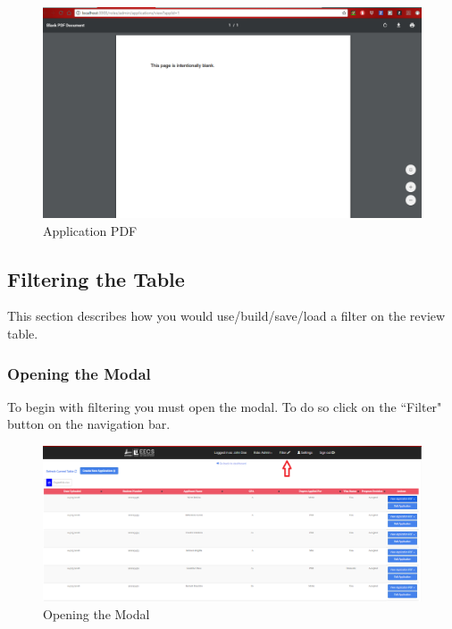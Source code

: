 \documentclass[fontsize=12pt,paper=letter,twoside]{scrartcl}
\begin{document}
\begin{figure}[!htb]
\begin{center}
\includegraphics[width=.9\textwidth]{images/ma/appl_pdf.png}
\end{center}
\caption{Application PDF}
\label{fig:appl_pdf}
\end{figure}

\clearpage
\subsection{Filtering the Table}
This section describes how you would use/build/save/load a filter on the review table.

\subsubsection{Opening the Modal}
To begin with filtering you must open the modal. To do so click on the ``Filter" button on the navigation bar.

\begin{figure}[!htb]
\begin{center}
\includegraphics[width=.99\textwidth]{images/ma/open_modal.png}
\end{center}
\caption{Opening the  Modal}
\label{fig:open_modal}
\end{figure}
\end{document}
